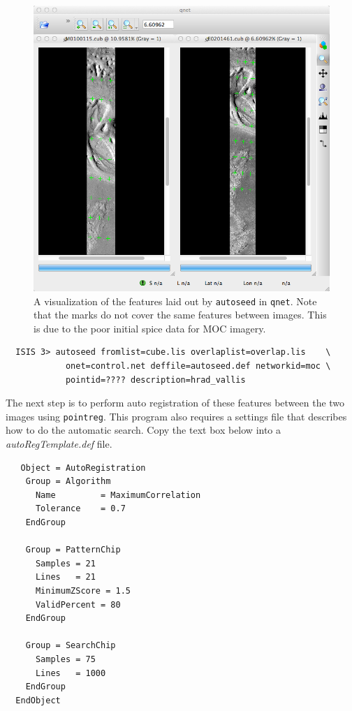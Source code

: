 \begin{figure}[ht]
  \centering
  \includegraphics[width=5in]{images/qnet/Qnet_AfterAutoseed.png}
  \caption{A visualization of the features laid out by
    \texttt{autoseed} in \texttt{qnet}. Note that the marks do not
    cover the same features between images. This is due to the poor
    initial spice data for MOC imagery.}
  \label{fig:after_autoseed}
\end{figure}

\begin{verbatim}
  ISIS 3> autoseed fromlist=cube.lis overlaplist=overlap.lis    \
            onet=control.net deffile=autoseed.def networkid=moc \
            pointid=???? description=hrad_vallis
\end{verbatim}

The next step is to perform auto registration of these features
between the two images using \texttt{pointreg}. This program also
requires a settings file that describes how to do the automatic
search. Copy the text box below into a \textit{autoRegTemplate.def}
file.

\begin{verbatim}
   Object = AutoRegistration
    Group = Algorithm
      Name         = MaximumCorrelation
      Tolerance    = 0.7
    EndGroup

    Group = PatternChip
      Samples = 21
      Lines   = 21
      MinimumZScore = 1.5
      ValidPercent = 80
    EndGroup

    Group = SearchChip
      Samples = 75
      Lines   = 1000
    EndGroup
  EndObject
\end{verbatim}


